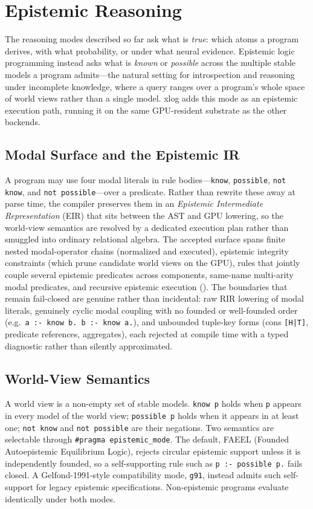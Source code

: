 \section{Epistemic Reasoning}\label{sec:epistemic}

The reasoning modes described so far ask what is \emph{true}: which atoms a program derives, with what probability, or under what neural evidence. Epistemic logic programming instead asks what is \emph{known} or \emph{possible} across the multiple stable models a program admits---the natural setting for introspection and reasoning under incomplete knowledge, where a query ranges over a program's whole space of world views rather than a single model. xlog adds this mode as an epistemic execution path, running it on the same GPU-resident substrate as the other backends.

\subsection{Modal Surface and the Epistemic IR}

A program may use four modal literals in rule bodies---\texttt{know}, \texttt{possible}, \texttt{not know}, and \texttt{not possible}---over a predicate. Rather than rewrite these away at parse time, the compiler preserves them in an \emph{Epistemic Intermediate Representation} (EIR) that sits between the AST and GPU lowering, so the world-view semantics are resolved by a dedicated execution plan rather than smuggled into ordinary relational algebra. The accepted surface spans finite nested modal-operator chains (normalized and executed), epistemic integrity constraints (which prune candidate world views on the GPU), rules that jointly couple several epistemic predicates across components, same-name multi-arity modal predicates, and recursive epistemic execution (). The boundaries that remain fail-closed are genuine rather than incidental: raw RIR lowering of modal literals, genuinely cyclic modal coupling with no founded or well-founded order (e.g.\ \texttt{a :- know b.\ b :- know a.}), and unbounded tuple-key forms (cons \texttt{[H|T]}, predicate references, aggregates), each rejected at compile time with a typed diagnostic rather than silently approximated.

\subsection{World-View Semantics}

A world view is a non-empty set of stable models. \texttt{know p} holds when \texttt{p} appears in every model of the world view; \texttt{possible p} holds when it appears in at least one; \texttt{not know} and \texttt{not possible} are their negations. Two semantics are selectable through \texttt{\#pragma epistemic\_mode}. The default, FAEEL (Founded Autoepistemic Equilibrium Logic), rejects circular epistemic support unless it is independently founded, so a self-supporting rule such as \texttt{p :- possible p.} fails closed. A Gelfond-1991-style compatibility mode, \texttt{g91}, instead admits such self-support for legacy epistemic specifications. Non-epistemic programs evaluate identically under both modes.


